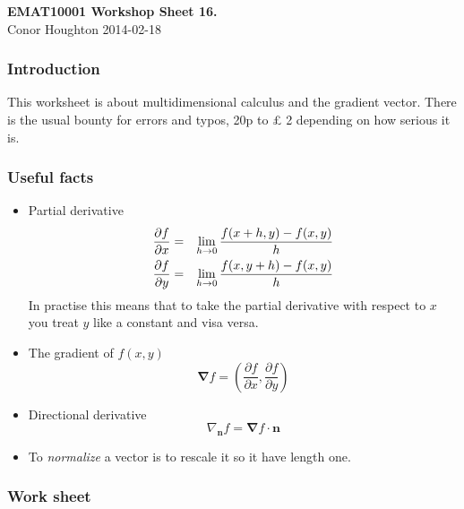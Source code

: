 \documentclass[12pt]{article}
\begin{document}
\begin{center}
{\bf EMAT10001 Workshop Sheet 16.}\\[1cm]{} Conor Houghton 2014-02-18
\end{center}
\subsubsection*{Introduction} 
This worksheet is about multidimensional calculus and the gradient
vector. There is the usual bounty for errors and typos, 20p to \pounds
2 depending on how serious it is.

\subsubsection*{Useful facts}
\begin{itemize}
\item Partial derivative
\begin{eqnarray}
\frac{\partial f}{\partial x}&=&\lim_{h\rightarrow 0}\frac{f(x+h,y)-f(x,y)}{h}\cr
\frac{\partial f}{\partial y}&=&\lim_{h\rightarrow 0}\frac{f(x,y+h)-f(x,y)}{h}
\end{eqnarray}
In practise this means that to take the partial derivative with
respect to $x$ you treat $y$ like a constant and visa versa.
\item The gradient of $f(x,y)$
\begin{equation}
\mathbf{\nabla}f=\left(\frac{\partial f}{\partial x},\frac{\partial f}{\partial y}\right)
\end{equation}
\item Directional derivative
\begin{equation}
\nabla_{\mathbf{n}}f=\mathbf{\nabla}f\cdot \mathbf{n}
\end{equation}
\item To \textsl{normalize} a vector is to rescale it so it have
  length one.
\end{itemize}
\subsubsection*{Work sheet}
\end{document}
